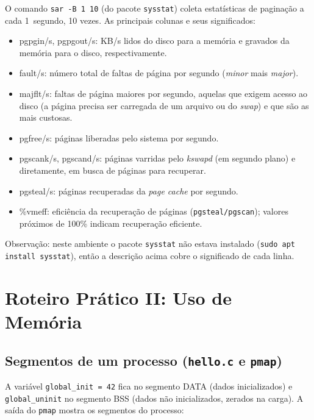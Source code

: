 \documentclass[11pt,a4paper]{article}
\begin{document}
O comando \texttt{sar -B 1 10} (do pacote \texttt{sysstat}) coleta estatísticas de paginação a cada
1~segundo, 10 vezes. As principais colunas e seus significados:
\begin{itemize}[nosep]
    \item pgpgin/s, pgpgout/s: KB/s lidos do disco para a memória e gravados da memória para o
    disco, respectivamente.
    \item fault/s: número total de faltas de página por segundo (\emph{minor} mais \emph{major}).
    \item majflt/s: faltas de página maiores por segundo, aquelas que exigem acesso ao disco (a
    página precisa ser carregada de um arquivo ou do \emph{swap}) e que são as mais custosas.
    \item pgfree/s: páginas liberadas pelo sistema por segundo.
    \item pgscank/s, pgscand/s: páginas varridas pelo \emph{kswapd} (em segundo plano) e diretamente,
    em busca de páginas para recuperar.
    \item pgsteal/s: páginas recuperadas da \emph{page cache} por segundo.
    \item \%vmeff: eficiência da recuperação de páginas (\texttt{pgsteal/pgscan}); valores próximos
    de 100\% indicam recuperação eficiente.
\end{itemize}
Observação: neste ambiente o pacote \texttt{sysstat} não estava instalado
(\texttt{sudo apt install sysstat}), então a descrição acima cobre o significado de cada linha.

\section{Roteiro Prático II: Uso de Memória}

\subsection{Segmentos de um processo (\texttt{hello.c} e \texttt{pmap})}



A variável \texttt{global\_init = 42} fica no segmento DATA (dados inicializados) e
\texttt{global\_uninit} no segmento BSS (dados não inicializados, zerados na carga). A saída do
\texttt{pmap} mostra os segmentos do processo:
\end{document}
